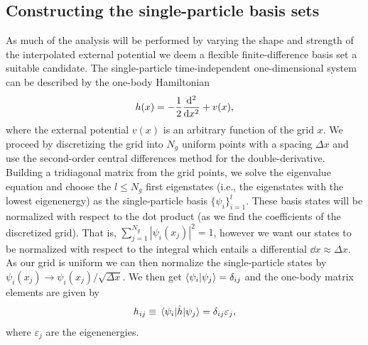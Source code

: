 \documentclass[twocolumn,superscriptaddress,unsortedaddress,
 amsmath,amssymb,
 aps,
]{revtex4-2}
\begin{document}
    \subsection{Constructing the single-particle basis sets}
        As much of the analysis will be performed by varying the shape and
        strength of the interpolated external potential we deem a flexible
        finite-difference basis set a suitable candidate.
        The single-particle time-independent one-dimensional system can be
        described by the one-body Hamiltonian
        \begin{align*}
            h(x) = -\frac{1}{2}\dv[2]{}{x}
            + v(x),
        \end{align*}
        where the external potential $v(x)$ is an arbitrary function of the grid $x$.
        We proceed by discretizing the grid into $N_g$ uniform points with a spacing
        $\Delta x$ and use the second-order central differences method for the
        double-derivative.
        Building a tridiagonal matrix from the grid points, we solve the eigenvalue
        equation and choose the $l \leq N_g$ first eigenstates (i.e., the eigenstates
        with the lowest eigenenergy) as the single-particle basis
        $\{\psi_i\}_{i = 1}^l$.
        These basis states will be normalized with respect to the dot product (as we
        find the coefficients of the discretized grid).
        That is, $\sum_{j = 1}^{N_g} | \psi_i(x_j) |^{2} = 1$, however we want our
        states to be normalized with respect to the integral which entails a
        differential $\dd{x} \approx \Delta x$.
        As our grid is uniform we can then normalize the single-particle states
        by $\psi_i(x_j) \to \psi_i(x_j) / \sqrt{\Delta x}$.
        We then get $\braket{\psi_i}{\psi_j} = \delta_{ij}$ and the one-body matrix
        elements are given by
        \begin{align*}
            h_{ij} \equiv \mel{\psi_i}{\hat{h}}{\psi_j}
            = \delta_{ij}\varepsilon_j,
        \end{align*}
        where $\varepsilon_j$ are the eigenenergies.
\end{document}
